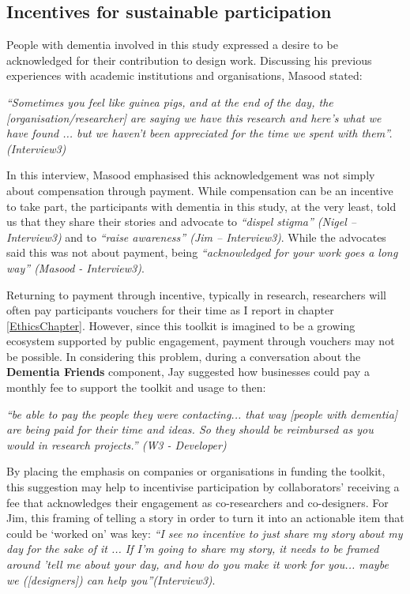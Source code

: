 \subsection{Incentives for sustainable participation}
People with dementia involved in this study expressed a desire to be acknowledged for their contribution to design work. Discussing his previous experiences with academic institutions and organisations, Masood stated:

\textit{``Sometimes you feel like guinea pigs, and at the end of the day, the [organisation/researcher] are saying we have this research and here's what we have found ... but we haven't been appreciated for the time we spent with them''. (Interview3)}

In this interview, Masood emphasised this acknowledgement was not simply about compensation through payment. While compensation can be an incentive to take part, the participants with dementia in this study, at the very least, told us that they share their stories and advocate to \textit{``dispel stigma'' (Nigel – Interview3)} and to \textit{``raise awareness'' (Jim – Interview3)}. While the advocates said this was not about payment, being \textit{``acknowledged for your work goes a long way'' (Masood - Interview3)}. 

Returning to payment through incentive, typically in research, researchers will often pay participants vouchers for their time as I report in chapter \ref{EthicsChapter}. However, since this toolkit is imagined to be a growing ecosystem supported by public engagement, payment through vouchers may not be possible. In considering this problem, during a conversation about the \textbf{Dementia Friends} component, Jay suggested how businesses could pay a monthly fee to support the toolkit and usage to then:

\textit{``be able to pay the people they were contacting... that way [people with dementia] are being paid for their time and ideas. So they should be reimbursed as you would in research projects.'' (W3 - Developer)}

By placing the emphasis on companies or organisations in funding the toolkit, this suggestion may help to incentivise participation by collaborators’ receiving a fee that acknowledges their engagement as co-researchers and co-designers. For Jim, this framing of telling a story in order to turn it into an actionable item that could be ‘worked on’ was key: 
\textit{ ``I see no incentive to just share my story about my day for the sake of it ... If I'm going to share my story, it needs to be framed around 'tell me about your day, and how do you make it work for you... maybe we ([designers]) can help you''(Interview3)}.
 
